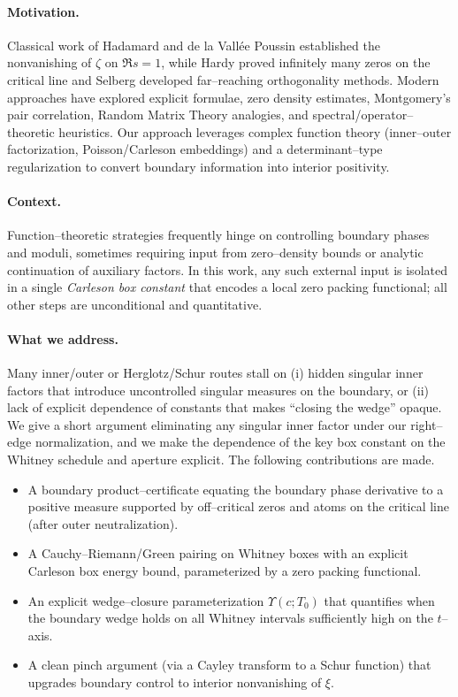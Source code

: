 \documentclass[11pt]{article}
\theoremstyle{definition}
\theoremstyle{remark}
\begin{document}
\paragraph{Motivation.}
Classical work of Hadamard and de la Vallée Poussin established the nonvanishing of $\zeta$ on $\Re s=1$,
while Hardy proved infinitely many zeros on the critical line and Selberg developed far--reaching orthogonality methods.
Modern approaches have explored explicit formulae, zero density estimates, Montgomery's pair correlation,
Random Matrix Theory analogies, and spectral/operator--theoretic heuristics.
Our approach leverages complex function theory (inner--outer factorization, Poisson/Carleson embeddings)
and a determinant--type regularization to convert boundary information into interior positivity.

\paragraph{Context.}
Function--theoretic strategies frequently hinge on controlling boundary phases and moduli, sometimes
requiring input from zero--density bounds or analytic continuation of auxiliary factors.
In this work, any such external input is isolated in a single \emph{Carleson box constant} that
encodes a local zero packing functional; all other steps are unconditional and quantitative.

\paragraph{What we address.}
Many inner/outer or Herglotz/Schur routes stall on
(i) hidden singular inner factors that introduce uncontrolled singular measures on the boundary, or
(ii) lack of explicit dependence of constants that makes ``closing the wedge'' opaque.
We give a short argument eliminating any singular inner factor under our right--edge normalization,
and we make the dependence of the key box constant on the Whitney schedule and aperture explicit.
The following contributions are made. \\
\begin{itemize} %
  \item A boundary product--certificate equating the boundary phase derivative to a positive measure supported by off--critical zeros and atoms on the critical line (after outer neutralization).
  \item A Cauchy--Riemann/Green pairing on Whitney boxes with an explicit Carleson box energy bound, parameterized by a zero packing functional.
  \item An explicit wedge--closure parameterization $\Upsilon(c;T_0)$ that quantifies when the boundary wedge holds on all Whitney intervals sufficiently high on the $t$--axis.
  \item A clean pinch argument (via a Cayley transform to a Schur function) that upgrades boundary control to interior nonvanishing of $\xi$.
\end{itemize}
\end{document}
